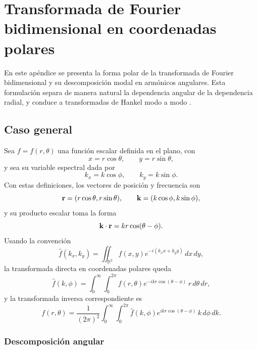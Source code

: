 \chapter{Transformada de Fourier bidimensional en coordenadas polares}
\label{sec:fourier_2d_polar}

En este apéndice se presenta la forma polar de la transformada de Fourier bidimensional y su descomposición modal en armónicos angulares. Esta formulación separa de manera natural la dependencia angular de la dependencia radial, y conduce a transformadas de Hankel modo a modo \cite{arfken2013,Watson1944}.

\section{Caso general}

Sea $f=f(r,\theta)$ una función escalar definida en el plano, con
\begin{equation}
  x=r\cos\theta, \qquad y=r\sin\theta,
\end{equation}
y sea su variable espectral dada por
\begin{equation}
  k_x=k\cos\phi, \qquad k_y=k\sin\phi.
\end{equation}
Con estas definiciones, los vectores de posición y frecuencia son
\begin{equation}
  \vb{r}=(r\cos\theta,r\sin\theta), \qquad \vb{k}=(k\cos\phi,k\sin\phi),
\end{equation}
y su producto escalar toma la forma
\begin{equation}
  \vb{k}\cdot\vb{r}=kr\cos(\theta-\phi).
\end{equation}
Usando la convención
\begin{equation}
  \hat f(k_x,k_y)=\iint_{\mathbb{R}^2} f(x,y)e^{-i(k_xx+k_yy)}\,dx\,dy,
\end{equation}
la transformada directa en coordenadas polares queda
\begin{equation}
  \hat f(k,\phi)=
  \int_0^\infty \int_0^{2\pi}
  f(r,\theta)e^{-ikr\cos(\theta-\phi)}\,r\,d\theta\,dr,
  \label{eq:fourier_2d_polar_directa}
\end{equation}
y la transformada inversa correspondiente es
\begin{equation}
  f(r,\theta)=
  \frac{1}{(2\pi)^2}
  \int_0^\infty \int_0^{2\pi}
  \hat f(k,\phi)e^{ikr\cos(\theta-\phi)}\,k\,d\phi\,dk.
  \label{eq:fourier_2d_polar_inversa}
\end{equation}

\subsection{Descomposición angular}
\label{subsec:fourier_2d_polar_modal}

